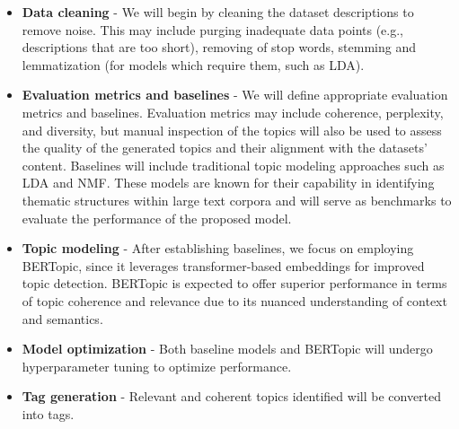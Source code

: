 \documentclass{article}
\begin{document}
\begin{itemize}
    \item \textbf{Data cleaning} - We will begin by cleaning the dataset descriptions to remove noise. This may include purging inadequate data points (e.g., descriptions that are too short), removing of stop words, stemming and lemmatization (for models which require them, such as LDA).

    \item \textbf{Evaluation metrics and baselines} - We will define appropriate evaluation metrics and baselines. Evaluation metrics may include coherence, perplexity, and diversity, but manual inspection of the topics will also be used to assess the quality of the generated topics and their alignment with the datasets' content. Baselines will include traditional topic modeling approaches such as LDA and NMF. These models are known for their capability in identifying thematic structures within large text corpora and will serve as benchmarks to evaluate the performance of the proposed model.

    \item \textbf{Topic modeling} - After establishing baselines, we focus on employing BERTopic, since it leverages transformer-based embeddings for improved topic detection. BERTopic is expected to offer superior performance in terms of topic coherence and relevance due to its nuanced understanding of context and semantics.

    \item \textbf{Model optimization} - Both baseline models and BERTopic will undergo hyperparameter tuning to optimize performance.

    \item \textbf{Tag generation} - Relevant and coherent topics identified will be converted into tags.
\end{itemize}
\end{document}
